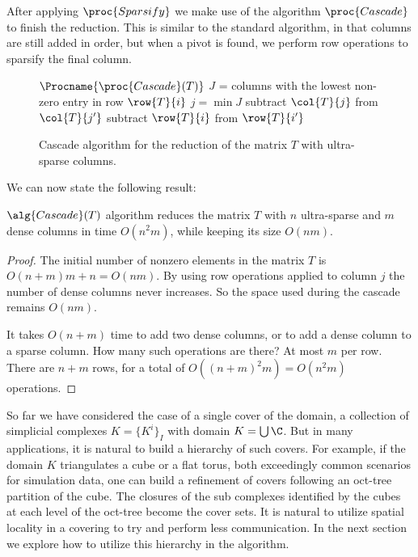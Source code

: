After applying $\proc{Sparsify}$ we make use of the algorithm $\proc{Cascade}$ to finish the reduction. This is similar to the standard algorithm, in that columns are still added in order, but when a pivot is found, we perform row operations to sparsify the final column.

\begin{figure}
\begin{codebox}
$\Procname{\proc{Cascade}(T)}$
\li    {}
\li    \Do
\li         $J$ = columns with the lowest non-zero entry in row $\row{T}{i}$
\li $j = \min J$
\li {}
 \li \Do  subtract $\col{T}{j}$ from $\col{T}{j'}$
\End
\li {}
\li  {}
\li \Do  subtract $\row{T}{i}$ from $\row{T}{i'}$    
        \End
    \End
\end{codebox}
\caption{Cascade algorithm for the reduction of the matrix $T$ with ultra-sparse columns.}
\label{alg:cascade}
\end{figure}

We can now state the following result:

\begin{theorem}
    \label{thm:complexity}
    $\alg{Cascade}(T)$ algorithm reduces the matrix $T$ with $n$ ultra-sparse and
    $m$ dense columns in time $O(n^2 m)$, while keeping its size $O(nm)$.
\end{theorem}
\begin{proof}
    The initial number of nonzero elements in the matrix $T$ is $O{(n + m) m + n} = O(nm)$.
     By using row operations applied to column $j$ the number of dense columns never increases. So the
     space used during the cascade remains $O(nm)$.

    It takes $O(n+m)$ time to add two dense columns, or to add a dense
    column to a sparse column. How many such operations are there?
    At most $m$ per row. There are $n+m$ rows, for a total of
    $O((n+m)^2 m) = O(n^2 m)$ operations.
\end{proof}

So far we have considered the case of a single cover of the domain, a collection
of simplicial complexes $K = \{ K^i \}_I$ with domain $K = \bigcup \C$. But in many
applications, it is natural to build a hierarchy of such covers. 
For example, if the domain $K$ triangulates a cube or a flat torus, both exceedingly common scenarios for
simulation data, one can build a refinement of covers following an oct-tree
partition of the cube. The closures of the sub complexes identified by the cubes at each level of the oct-tree 
become the cover sets. It is natural to utilize spatial locality in a covering to try and perform less communication.
In the next section we explore how to utilize this hierarchy in the algorithm.

